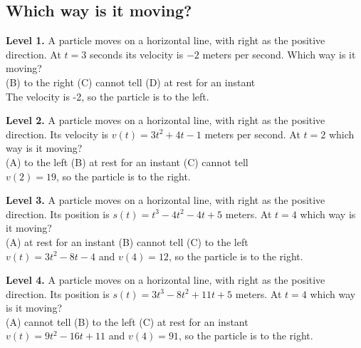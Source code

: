 \documentclass[11pt]{article}
\begin{document}
\subsection*{Which way is it moving?}
\noindent\textbf{Level 1.} A particle moves on a horizontal line, with right as the positive direction. At $t=3$ seconds its velocity is $-2$ meters per second. Which way is it moving?\\  \quad (B) to the right \quad (C) cannot tell \quad (D) at rest for an instant\\  \quad The velocity is -2, so the particle is to the left.\par\medskip
\noindent\textbf{Level 2.} A particle moves on a horizontal line, with right as the positive direction. Its velocity is $v(t)=3t^{2}+4t-1$ meters per second. At $t=2$ which way is it moving?\\ (A) to the left \quad (B) at rest for an instant \quad (C) cannot tell \quad {}\\  \quad $v(2)=19$, so the particle is to the right.\par\medskip
\noindent\textbf{Level 3.} A particle moves on a horizontal line, with right as the positive direction. Its position is $s(t)=t^{3}-4t^{2}-4t+5$ meters. At $t=4$ which way is it moving?\\ (A) at rest for an instant \quad (B) cannot tell \quad (C) to the left \quad {}\\  \quad $v(t)=3t^{2}-8t-4$ and $v(4)=12$, so the particle is to the right.\par\medskip
\noindent\textbf{Level 4.} A particle moves on a horizontal line, with right as the positive direction. Its position is $s(t)=3t^{3}-8t^{2}+11t+5$ meters. At $t=4$ which way is it moving?\\ (A) cannot tell \quad (B) to the left \quad (C) at rest for an instant \quad {}\\  \quad $v(t)=9t^{2}-16t+11$ and $v(4)=91$, so the particle is to the right.\par\medskip
\end{document}
